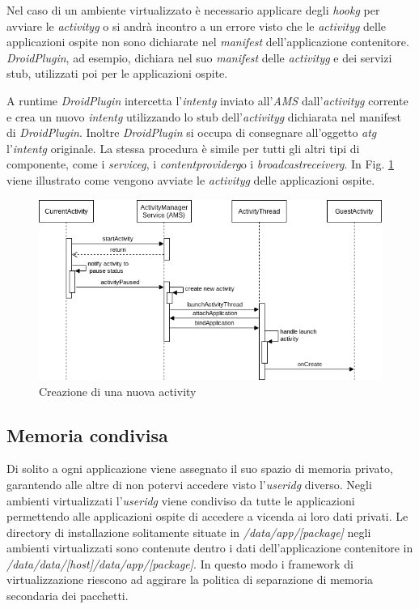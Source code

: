 Nel caso di un ambiente virtualizzato è necessario applicare degli \emph{\gls{hookg}} per avviare le \emph{\gls{activityg}} o si andrà incontro a un errore visto che le \emph{\gls{activityg}} delle applicazioni ospite non sono dichiarate nel \emph{manifest} dell'applicazione contenitore. \emph{DroidPlugin}, ad esempio, dichiara nel suo \emph{manifest} delle \emph{\gls{activityg}} e dei servizi stub, utilizzati poi per le applicazioni ospite.

A runtime \emph{DroidPlugin} intercetta l'\emph{\gls{intentg}} inviato all'\emph{AMS} dall'\emph{\gls{activityg}} corrente e crea un nuovo \emph{\gls{intentg}} utilizzando lo stub dell'\emph{\gls{activityg}} dichiarata nel manifest di \emph{DroidPlugin}. Inoltre \emph{DroidPlugin} si occupa di consegnare all'oggetto \emph{\gls{atg}} l'\emph{\gls{intentg}} originale.
La stessa procedura è simile per tutti gli altri tipi di componente, come i \emph{\gls{serviceg}}, i \emph{\gls{contentproviderg}}\glsfirstoccurspace o i \emph{\gls{broadcastreceiverg}}\glsfirstoccur.
In Fig. \ref{fig:ams} viene illustrato come vengono avviate le \emph{\gls{activityg}} delle applicazioni ospite.

\begin{figure} [H]
\includegraphics[width=\textwidth]{figures/newactivity}
\caption[Creazione di una nuova activity]{Creazione di una nuova activity
\label{fig:ams}}
\end{figure}


\subsection*{Memoria condivisa}

Di solito a ogni applicazione viene assegnato il suo spazio di memoria privato, garantendo alle altre di non potervi accedere visto l'\emph{\gls{useridg}} diverso.
Negli ambienti virtualizzati l'\emph{\gls{useridg}} viene condiviso da tutte le applicazioni permettendo alle applicazioni ospite di accedere a vicenda ai loro dati privati.
Le directory di installazione solitamente situate in \emph{/data/app/[package]} negli ambienti virtualizzati sono contenute dentro i dati dell'applicazione contenitore in \emph{/data/data/[host]/data/app/[package]}. In questo modo i framework di virtualizzazione riescono ad aggirare la politica di separazione di memoria secondaria dei pacchetti.


